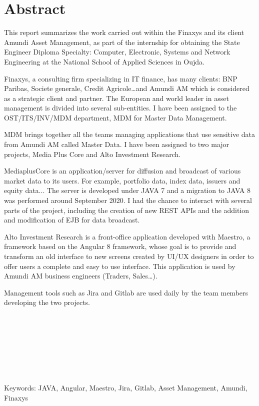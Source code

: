 
\chapter*{Abstract}
\par This report summarizes the work carried out within the Finaxys and its client Amundi Asset Management, as part of the internship for obtaining the State Engineer Diploma Specialty: Computer, Electronic, Systems and Network Engineering at the National School of Applied Sciences in Oujda.  \\
\par Finaxys, a consulting firm specializing in IT finance, has many clients: BNP Paribas, Societe generale, Credit Agricole\dots and Amundi AM which is considered as a strategic client and partner. The European and world leader in asset management is divided into several sub-entities. I have been assigned to the OST/ITS/INV/MDM department, MDM for Master Data Management. \\
\par MDM brings together all the teams managing applications that use sensitive data from Amundi AM called Master Data. I have been assigned to two major projects, Media Plus Core and Alto Investment Research. \\
\par MediaplusCore is an application/server for diffusion and broadcast of various market data to its users. For example, portfolio data, index data, issuers and equity data... The server is developed under JAVA 7 and a migration to JAVA 8 was performed around September 2020. I had the chance to interact with several parts of the project, including the creation of new REST APIs and the addition and modification of EJB for data broadcast. \\
\par Alto Investment Research is a front-office application developed with Maestro, a framework based on the Angular 8 framework, whose goal is to provide and transform an old interface to new screens created by UI/UX designers in order to offer users a complete and easy to use interface. This application is used by Amundi AM business engineers (Traders, Sales\dots). \\
\par Management tools such as Jira and Gitlab are used daily by the team members developing the two projects.
\\~\\~\\~\\~\\~\\~\\~\\
\par Keywords: JAVA, Angular, Maestro, Jira, Gitlab, Asset Management, Amundi, Finaxys